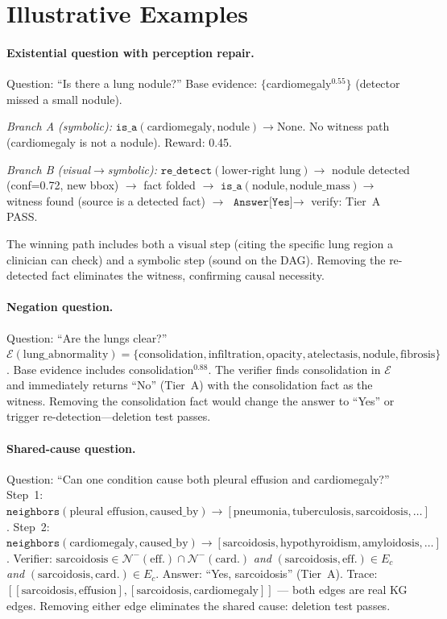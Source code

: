 \documentclass[runningheads]{llncs}
\begin{document}
\section{Illustrative Examples}
\label{sec:examples}

\paragraph{Existential question with perception repair.}
Question: ``Is there a lung nodule?''
Base evidence: $\{$cardiomegaly$^{0.55}\}$ (detector missed a small nodule).

\noindent
\emph{Branch A (symbolic):}
$\texttt{is\_a}(\text{cardiomegaly}, \text{nodule}) \to \text{None}$.
No witness path (cardiomegaly is not a nodule). Reward: 0.45.

\noindent
\emph{Branch B (visual$\to$symbolic):}
$\texttt{re\_detect}(\text{lower-right lung}) \to$ nodule detected
(conf=0.72, new bbox) $\to$ fact folded $\to$
$\texttt{is\_a}(\text{nodule}, \text{nodule\_mass}) \to$ witness found
(source is a detected fact) $\to$
$\texttt{Answer[Yes]} \to$ verify: Tier~A PASS.

The winning path includes both a visual step (citing the specific lung
region a clinician can check) and a symbolic step (sound on the DAG).
Removing the re-detected fact eliminates the witness, confirming causal
necessity.

\paragraph{Negation question.}
Question: ``Are the lungs clear?''
$\mathcal{E}(\text{lung\_abnormality}) = \{\text{consolidation},
\text{infiltration}, \text{opacity}, \text{atelectasis},
\text{nodule}, \text{fibrosis}\}$.
Base evidence includes consolidation$^{0.88}$.
The verifier finds consolidation in $\mathcal{E}$ and immediately returns
``No'' (Tier~A) with the consolidation fact as the witness.
Removing the consolidation fact would change the answer to ``Yes'' or
trigger re-detection---deletion test passes.

\paragraph{Shared-cause question.}
Question: ``Can one condition cause both pleural effusion and
cardiomegaly?''
Step~1: $\texttt{neighbors}(\text{pleural effusion}, \text{caused\_by})
\to [\text{pneumonia}, \text{tuberculosis}, \text{sarcoidosis}, \ldots]$.
Step~2: $\texttt{neighbors}(\text{cardiomegaly}, \text{caused\_by})
\to [\text{sarcoidosis}, \text{hypothyroidism}, \text{amyloidosis},
\ldots]$.
Verifier: $\text{sarcoidosis} \in \mathcal{N}^-(\text{eff.}) \cap
\mathcal{N}^-(\text{card.})$ \emph{and}
$(\text{sarcoidosis}, \text{eff.}) \in E_c$ \emph{and}
$(\text{sarcoidosis}, \text{card.}) \in E_c$.
Answer: ``Yes, sarcoidosis'' (Tier~A).
Trace: $[[\text{sarcoidosis}, \text{effusion}],
[\text{sarcoidosis}, \text{cardiomegaly}]]$ --- both edges are real KG
edges.
Removing either edge eliminates the shared cause: deletion test passes.
\end{document}
